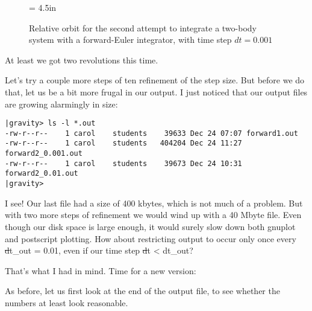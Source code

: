 \begin{figure}[ht]
\begin{center}
\epsfxsize = 4.5in
\caption[Two-body orbit with a forward-Euler integrator, time step
$dt = 0.001$]
{Relative orbit for the second attempt to integrate a two-body system with a
forward-Euler integrator, with time step $dt = 0.001$}
\label{fig:forward2-0.001}
\end{center}
\end{figure}

\abc

\alice
At least we got two revolutions this time.

\carol
Let's try a couple more steps of ten refinement of the step size.
But before we do that, let us be a bit more frugal in our output.
I just noticed that our output files are growing alarmingly in size:

\cba

\begin{small}
\begin{verbatim}
|gravity> ls -l *.out
-rw-r--r--    1 carol    students    39633 Dec 24 07:07 forward1.out
-rw-r--r--    1 carol    students   404204 Dec 24 11:27 forward2_0.001.out
-rw-r--r--    1 carol    students    39673 Dec 24 10:31 forward2_0.01.out
|gravity> 
\end{verbatim}
\end{small}

\abc

\bob
I see!  Our last file had a size of 400 kbytes, which is not much of a
problem.  But with two more steps of refinement we would wind up with
a 40 Mbyte file.  Even though our disk space is large enough, it would
surely slow down both gnuplot and postscript plotting.  How about
restricting output to occur only once every {\st dt\_out = 0.01}, even
if our time step {\st dt < dt\_out}?

\carol
That's what I had in mind.  Time for a new version:

\cba


\abc

\carol
As before, let us first look at the end of the output file, to see
whether the numbers at least look reasonable.

\cba


